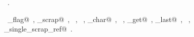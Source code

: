 \documentclass{report}
\begin{document}
\begin{flushleft}
\begin{minipage}{\linewidth}
\vspace{-1ex}
\footnotesize\addtolength{\baselineskip}{-1ex}
\begin{list}{}{\setlength{\itemsep}{-\parsep}\setlength{\itemindent}{-\leftmargin}}
\item \NWtxtMacroRefIn\ .
\end{list}
\vspace{-2ex}
\footnotesize\addtolength{\baselineskip}{-1ex}
\begin{list}{}{\setlength{\itemsep}{-\parsep}\setlength{\itemindent}{-\leftmargin}}
\item \NWtxtIdentsUsed\nobreak\  \verb@arglabels_flag@\nobreak\ , \verb@copy_scrap@\nobreak\ , \verb@fprintf@\nobreak\ , \verb@fputs@\nobreak\ , \verb@nw_char@\nobreak\ , \verb@scraps@\nobreak\ , \verb@source_get@\nobreak\ , \verb@source_last@\nobreak\ , \verb@TRUE@\nobreak\ , \verb@write_single_scrap_ref@\nobreak\ .\end{list}
\end{minipage}\\[4ex]
\end{flushleft}
\end{document}
